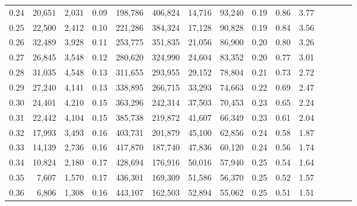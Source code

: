 \begin{tabular}{rrrcrrrrrrrrrrr}
0.24 &  20,651 &  2,031 &                                       0.09 &  198,786 &  406,824 &   14,716 &   93,240 &  0.19 &  0.86 &                         3.77 \\
0.25 &  22,500 &  2,412 &                                       0.10 &  221,286 &  384,324 &   17,128 &   90,828 &  0.19 &  0.84 &                         3.56 \\
0.26 &  32,489 &  3,928 &                                       0.11 &  253,775 &  351,835 &   21,056 &   86,900 &  0.20 &  0.80 &                         3.26 \\
0.27 &  26,845 &  3,548 &                                       0.12 &  280,620 &  324,990 &   24,604 &   83,352 &  0.20 &  0.77 &                         3.01 \\
0.28 &  31,035 &  4,548 &                                       0.13 &  311,655 &  293,955 &   29,152 &   78,804 &  0.21 &  0.73 &                         2.72 \\
0.29 &  27,240 &  4,141 &                                       0.13 &  338,895 &  266,715 &   33,293 &   74,663 &  0.22 &  0.69 &                         2.47 \\
0.30 &  24,401 &  4,210 &                                       0.15 &  363,296 &  242,314 &   37,503 &   70,453 &  0.23 &  0.65 &                         2.24 \\
0.31 &  22,442 &  4,104 &                                       0.15 &  385,738 &  219,872 &   41,607 &   66,349 &  0.23 &  0.61 &                         2.04 \\
0.32 &  17,993 &  3,493 &                                       0.16 &  403,731 &  201,879 &   45,100 &   62,856 &  0.24 &  0.58 &                         1.87 \\
0.33 &  14,139 &  2,736 &                                       0.16 &  417,870 &  187,740 &   47,836 &   60,120 &  0.24 &  0.56 &                         1.74 \\
0.34 &  10,824 &  2,180 &                                       0.17 &  428,694 &  176,916 &   50,016 &   57,940 &  0.25 &  0.54 &                         1.64 \\
0.35 &   7,607 &  1,570 &                                       0.17 &  436,301 &  169,309 &   51,586 &   56,370 &  0.25 &  0.52 &                         1.57 \\
0.36 &   6,806 &  1,308 &                                       0.16 &  443,107 &  162,503 &   52,894 &   55,062 &  0.25 &  0.51 &                         1.51 \\

\end{tabular}
